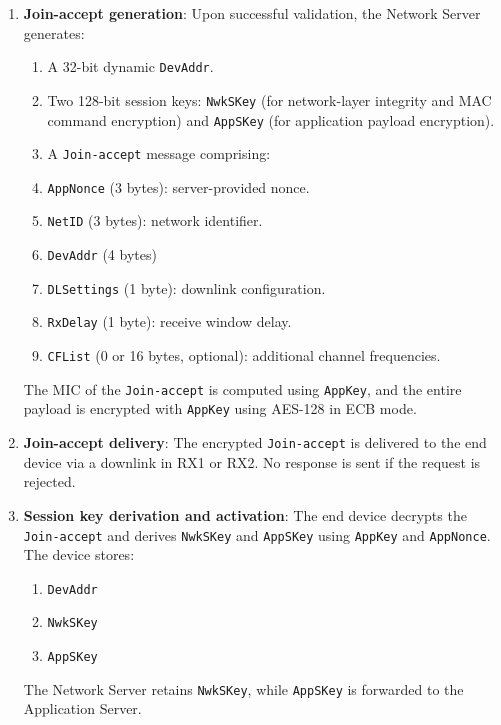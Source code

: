 \begin{enumerate}
    \item \textbf{Join-accept generation}: Upon successful validation, the Network Server generates:
          \begin{enumerate}
              \item A 32-bit dynamic \texttt{DevAddr}.
              \item Two 128-bit session keys: \texttt{NwkSKey} (for network-layer integrity and MAC command encryption) and \texttt{AppSKey} (for application payload encryption).
              \item A \texttt{Join-accept} message comprising:
              \item \texttt{AppNonce} (3 bytes): server-provided nonce.
              \item \texttt{NetID} (3 bytes): network identifier.
              \item \texttt{DevAddr} (4 bytes)
              \item \texttt{DLSettings} (1 byte): downlink configuration.
              \item \texttt{RxDelay} (1 byte): receive window delay.
              \item \texttt{CFList} (0 or 16 bytes, optional): additional channel frequencies.
          \end{enumerate}
          The MIC of the \texttt{Join-accept} is computed using \texttt{AppKey}, and the entire payload is encrypted with \texttt{AppKey} using AES-128 in ECB mode.

    \item \textbf{Join-accept delivery}: The encrypted \texttt{Join-accept} is delivered to the end device via a downlink in RX1 or RX2. No response is sent if the request is rejected.

    \item \textbf{Session key derivation and activation}: The end device decrypts the \texttt{Join-accept} and derives \texttt{NwkSKey} and \texttt{AppSKey} using \texttt{AppKey} and \texttt{AppNonce}. The device stores:
          \begin{enumerate}
              \item \texttt{DevAddr}
              \item \texttt{NwkSKey}
              \item \texttt{AppSKey}
          \end{enumerate}
          The Network Server retains \texttt{NwkSKey}, while \texttt{AppSKey} is forwarded to the Application Server.
\end{enumerate}

